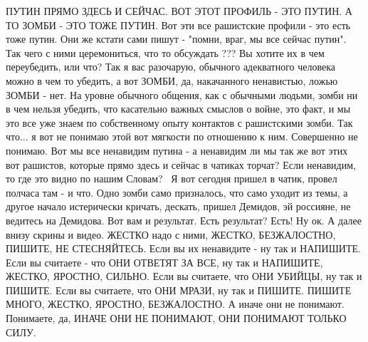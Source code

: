 ПУТИН ПРЯМО ЗДЕСЬ И СЕЙЧАС. ВОТ ЭТОТ ПРОФИЛЬ - ЭТО ПУТИН. А ТО ЗОМБИ - ЭТО ТОЖЕ
ПУТИН. Вот эти все рашистские профили - это есть тоже путин. Они же кстати сами
пишут - "помни, враг, мы все сейчас путин". Так чего с ними церемониться, что
то обсуждать ??? Вы хотите их в чем переубедить, или что? Так я вас разочарую,
обычного адекватного человека можно в чем то убедить, а вот ЗОМБИ, да,
накачанного ненавистью, ложью ЗОМБИ - нет. На уровне обычного общения, как с
обычными людьми, зомби ни в чем нельзя убедить, что касательно важных смыслов о
войне, это факт, и мы это все уже знаем по собственному опыту контактов с
рашистскими зомби.  Так что... я вот не понимаю этой вот мягкости по отношению
к ним. Совершенно не понимаю. Вот мы все ненавидим путина - а ненавидим ли мы
так же вот этих вот рашистов, которые прямо здесь и сейчас в чатиках торчат?
Если ненавидим, то где это видно по нашим Словам?  Я вот сегодня пришел в
чатик, провел полчаса там - и что. Одно зомби само призналось, что само уходит
из темы, а другое начало истерически кричать, дескать, пришел Демидов, эй
россияне, не ведитесь на Демидова. Вот вам и результат. Есть результат? Есть!
Ну ок. А далее внизу скрины и видео. ЖЕСТКО надо с ними, ЖЕСТКО, БЕЗЖАЛОСТНО,
ПИШИТЕ, НЕ СТЕСНЯЙТЕСЬ. Если вы их ненавидите - ну так и НАПИШИТЕ. Если вы
считаете - что ОНИ ОТВЕТЯТ ЗА ВСЕ, ну так и НАПИШИТЕ, ЖЕСТКО, ЯРОСТНО, СИЛЬНО.
Если вы считаете, что ОНИ УБИЙЦЫ, ну так и ПИШИТЕ. Если вы считаете, что ОНИ
МРАЗИ, ну так и ПИШИТЕ. ПИШИТЕ МНОГО, ЖЕСТКО, ЯРОСТНО, БЕЗЖАЛОСТНО. А иначе они
не понимают. Понимаете, да, ИНАЧЕ ОНИ НЕ ПОНИМАЮТ, ОНИ ПОНИМАЮТ ТОЛЬКО СИЛУ.

